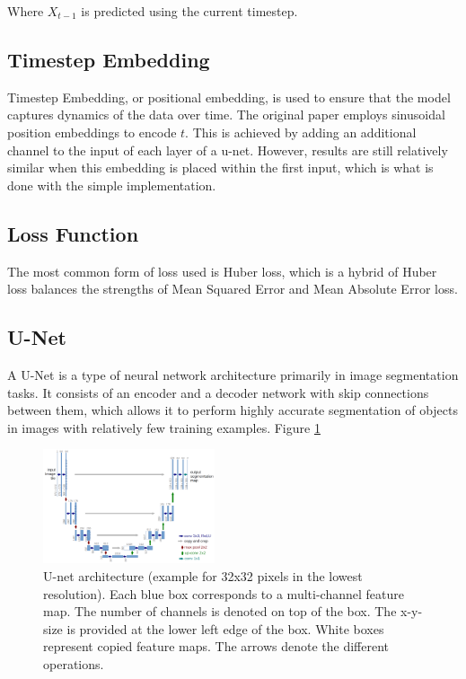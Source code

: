 \documentclass[conference]{IEEEtran}
\begin{document}
Where $X_{t-1}$ is predicted using the current timestep.

\subsection{Timestep Embedding}

Timestep Embedding, or positional embedding, is used to ensure that the model
captures dynamics of the data over time. The original paper employs sinusoidal
position embeddings to encode $t$. This is achieved by adding an additional
channel to the input of each layer of a u-net. However, results are still
relatively similar when this embedding is placed within the first input, which
is what is done with the simple implementation.

\subsection{Loss Function}

The most common form of loss used is Huber loss, which is a hybrid of Huber
loss balances the strengths of Mean Squared Error and Mean Absolute Error
loss\cite{kerasDDPM}.

\subsection{U-Net}

A U-Net is a type of neural network architecture primarily in image
segmentation tasks. It consists of an encoder and a decoder network with skip
connections between them, which allows it to perform highly accurate
segmentation of objects in images with relatively few training examples. Figure
\ref{fig:unetarc}

\begin{figure}[htbp]
    \centering
    \includegraphics[width=0.45\textwidth]{../images/u-net-architecture.png}
    \caption{U-net architecture (example for 32x32 pixels in the lowest resolution). Each blue box corresponds to a multi-channel feature map. The number of channels is denoted on top of the box. The x-y-size is provided at the lower left edge of the box. White boxes represent copied feature maps. The arrows denote the different operations. \cite{RFB15a}}
    \label{fig:unetarc}
\end{figure}
\end{document}
